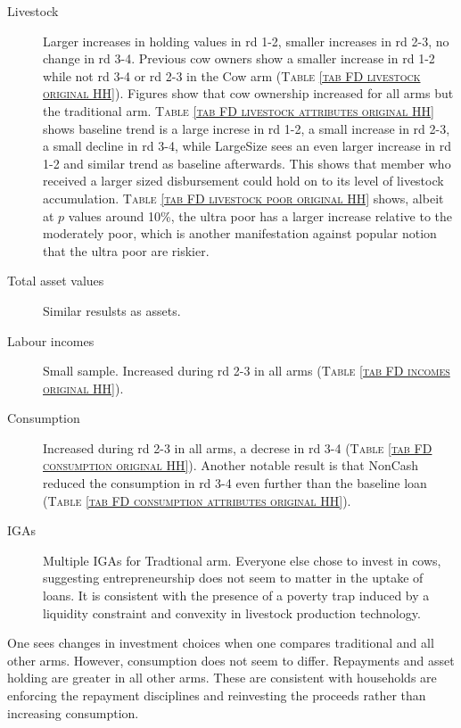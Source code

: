 \begin{description}
\item[Livestock]	Larger increases in holding values in rd 1-2, smaller increases in rd 2-3, no change in rd 3-4. Previous cow owners show a smaller increase in rd 1-2 while not rd 3-4 or rd 2-3 in the \textsf{Cow} arm (\textsc{\normalsize Table \ref{tab FD livestock original HH}}). Figures show that cow ownership increased for all arms but the \textsf{traditional} arm. \textsc{\normalsize Table \ref{tab FD livestock attributes original HH}} shows baseline trend is a large increse in rd 1-2, a small increase in rd 2-3, a small decline in rd 3-4, while \textsf{LargeSize} sees an even larger increase in rd 1-2 and similar trend as baseline afterwards. This shows that member who received a larger sized disbursement could hold on to its level of livestock accumulation. \textsc{\normalsize Table \ref{tab FD livestock poor original HH}} shows, albeit at $p$ values around 10\%, the ultra poor has a larger increase relative to the moderately poor, which is another manifestation against popular notion that the ultra poor are riskier.
\item[Total asset values]	Similar resulsts as assets.
\item[Labour incomes]	Small sample. Increased during rd 2-3 in all arms (\textsc{\normalsize Table \ref{tab FD incomes original HH}}). 
\item[Consumption]	Increased during rd 2-3 in all arms, a decrese in rd 3-4 (\textsc{\normalsize Table \ref{tab FD consumption original HH}}). Another notable result is that \textsf{NonCash} reduced the consumption in rd 3-4 even further than the baseline loan (\textsc{\normalsize Table \ref{tab FD consumption attributes original HH}}).
\item[IGAs]	Multiple IGAs for \textsf{Tradtional} arm. Everyone else chose to invest in cows, suggesting entrepreneurship does not seem to matter in the uptake of loans. It is consistent with the presence of a poverty trap induced by a liquidity constraint and convexity in livestock production technology.
\end{description}

One sees changes in investment choices when one compares \textsf{traditional} and all other arms. However, consumption does not seem to differ. Repayments and asset holding are greater in all other arms. These are consistent with households are enforcing the repayment disciplines and reinvesting the proceeds rather than increasing consumption. 


